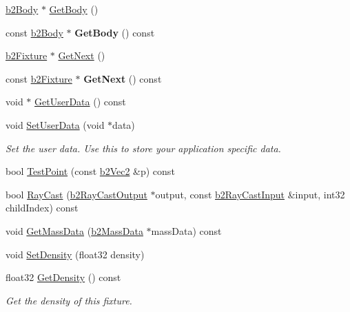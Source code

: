 \begin{DoxyCompactItemize}
\hyperlink{classb2Body}{b2\+Body} $\ast$ \hyperlink{classb2Fixture_a9d6536ef274d768e86ab0a8330921535}{Get\+Body} ()
\item 
\mbox{\label{classb2Fixture_ae9cabf82e360f92e8fcb36b1923ab991}} 
const \hyperlink{classb2Body}{b2\+Body} $\ast$ {\bfseries Get\+Body} () const
\item 
\hyperlink{classb2Fixture}{b2\+Fixture} $\ast$ \hyperlink{classb2Fixture_a0241952461f6f1a04a3c850306390fd2}{Get\+Next} ()
\item 
\mbox{\label{classb2Fixture_a6b474fa22b49de3dbe446a67f021beb2}} 
const \hyperlink{classb2Fixture}{b2\+Fixture} $\ast$ {\bfseries Get\+Next} () const
\item 
void $\ast$ \hyperlink{classb2Fixture_ae2a865ed59ffe9b1cb89f577052f4d50}{Get\+User\+Data} () const
\item 
\mbox{\label{classb2Fixture_a3db7f89ef4493247d922fe3d96351ad9}} 
void \hyperlink{classb2Fixture_a3db7f89ef4493247d922fe3d96351ad9}{Set\+User\+Data} (void $\ast$data)
\begin{DoxyCompactList}\small\item\em Set the user data. Use this to store your application specific data. \end{DoxyCompactList}\item 
bool \hyperlink{classb2Fixture_aa56d3ca04a5d0478c6477876cd480cc6}{Test\+Point} (const \hyperlink{structb2Vec2}{b2\+Vec2} \&p) const
\item 
bool \hyperlink{classb2Fixture_aaaafd69aa3e1a922acc4b9d7fb49170a}{Ray\+Cast} (\hyperlink{structb2RayCastOutput}{b2\+Ray\+Cast\+Output} $\ast$output, const \hyperlink{structb2RayCastInput}{b2\+Ray\+Cast\+Input} \&input, int32 child\+Index) const
\item 
void \hyperlink{classb2Fixture_a4532a12e848c5ceb5a3b94cf45b7cbad}{Get\+Mass\+Data} (\hyperlink{structb2MassData}{b2\+Mass\+Data} $\ast$mass\+Data) const
\item 
void \hyperlink{classb2Fixture_ad4e1d9323103975c8931d022b952d04a}{Set\+Density} (float32 density)
\item 
\mbox{\label{classb2Fixture_a228861bb1b1d7b2fb6e091401340784e}} 
float32 \hyperlink{classb2Fixture_a228861bb1b1d7b2fb6e091401340784e}{Get\+Density} () const
\begin{DoxyCompactList}\small\item\em Get the density of this fixture. \end{DoxyCompactList}\item 

\end{DoxyCompactItemize}
